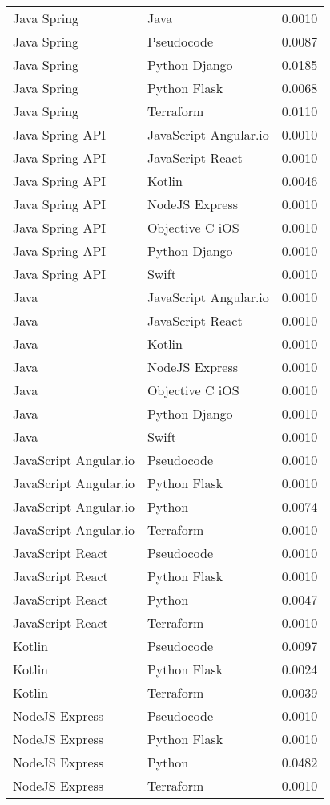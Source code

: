 {\begin{longtable}{lll}
Java Spring & Java & 0.0010\\
Java Spring & Pseudocode & 0.0087\\
Java Spring & Python Django & 0.0185\\
Java Spring & Python Flask & 0.0068\\
Java Spring & Terraform & 0.0110\\
Java Spring API & JavaScript Angular.io & 0.0010\\
Java Spring API & JavaScript React & 0.0010\\
Java Spring API & Kotlin & 0.0046\\
Java Spring API & NodeJS Express & 0.0010\\
Java Spring API & Objective C iOS & 0.0010\\
Java Spring API & Python Django & 0.0010\\
Java Spring API & Swift & 0.0010\\
Java & JavaScript Angular.io & 0.0010\\
Java & JavaScript React & 0.0010\\
Java & Kotlin & 0.0010\\
Java & NodeJS Express & 0.0010\\
Java & Objective C iOS & 0.0010\\
Java & Python Django & 0.0010\\
Java & Swift & 0.0010\\
JavaScript Angular.io & Pseudocode & 0.0010\\
JavaScript Angular.io & Python Flask & 0.0010\\
JavaScript Angular.io & Python & 0.0074\\
JavaScript Angular.io & Terraform & 0.0010\\
JavaScript React & Pseudocode & 0.0010\\
JavaScript React & Python Flask & 0.0010\\
JavaScript React & Python & 0.0047\\
JavaScript React & Terraform & 0.0010\\
Kotlin & Pseudocode & 0.0097\\
Kotlin & Python Flask & 0.0024\\
Kotlin & Terraform & 0.0039\\
NodeJS Express & Pseudocode & 0.0010\\
NodeJS Express & Python Flask & 0.0010\\
NodeJS Express & Python & 0.0482\\
NodeJS Express & Terraform & 0.0010\\

\end{longtable}}
